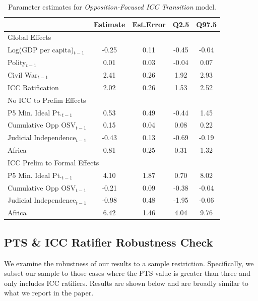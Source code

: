 \begin{table}[ht]
\centering
\begin{tabular}{lcccc}
  \hline\hline
 & Estimate & Est.Error & Q2.5 & Q97.5 \\
  \hline
  \multicolumn{4}{l}{Global Effects} \\
  Log(GDP per capita)$_{t-1}$ & -0.25 & 0.11 & -0.45 & -0.04 \\
  Polity$_{t-1}$ & 0.01 & 0.03 & -0.04 & 0.07 \\
  Civil War$_{t-1}$ & 2.41 & 0.26 & 1.92 & 2.93 \\
  ICC Ratification & 2.02 & 0.26 & 1.53 & 2.52 \\
  \hline
  \multicolumn{4}{l}{No ICC to Prelim Effects} \\
  P5 Min. Ideal Pt.$_{t-1}$ & 0.53 & 0.49 & -0.44 & 1.45 \\
  Cumulative Opp OSV$_{t-1}$ & 0.15 & 0.04 & 0.08 & 0.22 \\
  Judicial Independence$_{t-1}$ & -0.43 & 0.13 & -0.69 & -0.19 \\
  Africa & 0.81 & 0.25 & 0.31 & 1.32 \\
  \hline
  \multicolumn{4}{l}{ICC Prelim to Formal Effects} \\
  P5 Min. Ideal Pt.$_{t-1}$ & 4.10 & 1.87 & 0.70 & 8.02 \\
  Cumulative Opp OSV$_{t-1}$ & -0.21 & 0.09 & -0.38 & -0.04 \\
  Judicial Independence$_{t-1}$ & -0.98 & 0.48 & -1.95 & -0.06 \\
  Africa & 6.42 & 1.46 & 4.04 & 9.76 \\
   \hline\hline
\end{tabular}
\caption{Parameter estimates for \emph{Opposition-Focused ICC Transition} model.}
\end{table}

\FloatBarrier
\clearpage
\subsection*{PTS \& ICC Ratifier Robustness Check}


We examine the robustness of our results to a sample restriction. Specifically, we subset our sample to those cases where the PTS value is greater than three and only includes ICC ratifiers. Results are shown below and are broadly similar to what we report in the paper.

